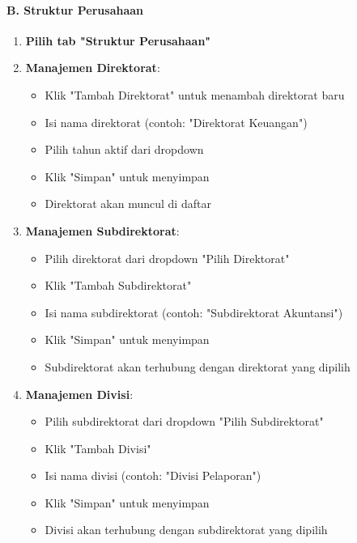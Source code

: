\documentclass[12pt,a4paper]{article}
\begin{document}
\paragraph{B. Struktur Perusahaan}
\begin{enumerate}
\item \textbf{Pilih tab "Struktur Perusahaan"}
\item \textbf{Manajemen Direktorat}:
\begin{itemize}
\item Klik "Tambah Direktorat" untuk menambah direktorat baru
\item Isi nama direktorat (contoh: "Direktorat Keuangan")
\item Pilih tahun aktif dari dropdown
\item Klik "Simpan" untuk menyimpan
\item Direktorat akan muncul di daftar
\end{itemize}
\item \textbf{Manajemen Subdirektorat}:
\begin{itemize}
\item Pilih direktorat dari dropdown "Pilih Direktorat"
\item Klik "Tambah Subdirektorat"
\item Isi nama subdirektorat (contoh: "Subdirektorat Akuntansi")
\item Klik "Simpan" untuk menyimpan
\item Subdirektorat akan terhubung dengan direktorat yang dipilih
\end{itemize}
\item \textbf{Manajemen Divisi}:
\begin{itemize}
\item Pilih subdirektorat dari dropdown "Pilih Subdirektorat"
\item Klik "Tambah Divisi"
\item Isi nama divisi (contoh: "Divisi Pelaporan")
\item Klik "Simpan" untuk menyimpan
\item Divisi akan terhubung dengan subdirektorat yang dipilih
\end{itemize}
\end{enumerate}
\end{document}
